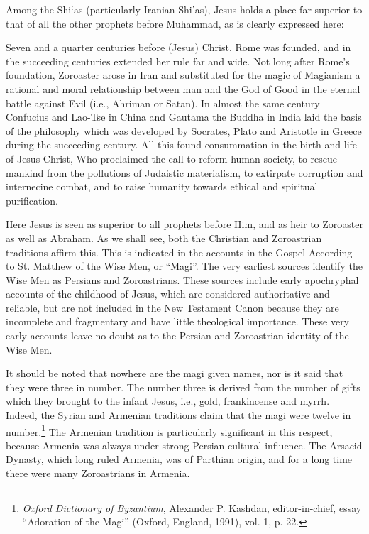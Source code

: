Among the Shi`as (particularly Iranian Shi'as), Jesus holds a place far superior to that of all the other prophets before Muhammad, as is clearly expressed here:

\begin{quotex}
Seven and a quarter centuries before (Jesus) Christ, Rome was founded, and in the succeeding centuries extended her rule far and wide. Not long after Rome's foundation, Zoroaster arose in Iran and substituted for the magic of Magianism a rational and moral relationship between man and the God of Good in the eternal battle against Evil (i.e., Ahriman or Satan). In almost the same century Confucius and Lao-Tse in China and Gautama the Buddha in India laid the basis of the philosophy which was developed by Socrates, Plato and Aristotle in Greece during the succeeding century. All this found consummation in the birth and life of Jesus Christ, Who proclaimed the call to reform human society, to rescue mankind from the pollutions of Judaistic materialism, to extirpate corruption and internecine combat, and to raise humanity towards ethical and spiritual purification.
\end{quotex}


Here Jesus is seen as superior to all prophets before Him, and as heir to Zoroaster as well as Abraham. As we shall see, both the Christian and Zoroastrian traditions affirm this. This is indicated in the accounts in the Gospel According to St. Matthew of the Wise Men, or ``Magi''. The very earliest sources identify the Wise Men as Persians and Zoroastrians. These sources include early apochryphal accounts of the childhood of Jesus, which are considered authoritative and reliable, but are not included in the New Testament Canon because they are incomplete and fragmentary and have little theological importance. These very early accounts leave no doubt as to the Persian and Zoroastrian identity of the Wise Men.

It should be noted that nowhere are the magi given names, nor is it said that they were three in number. The number three is derived from the number of gifts which they brought to the infant Jesus, i.e., gold, frankincense and myrrh. Indeed, the Syrian and Armenian traditions claim that the magi were twelve in number.\footnote{\emph{Oxford Dictionary of Byzantium}, Alexander P. Kashdan, editor-in-chief, essay ``Adoration of the Magi'' (Oxford, England, 1991), vol. 1, p. 22.} The Armenian tradition is particularly significant in this respect, because Armenia was always under strong Persian cultural influence. The Arsacid Dynasty, which long ruled Armenia, was of Parthian origin, and for a long time there were many Zoroastrians in Armenia.

